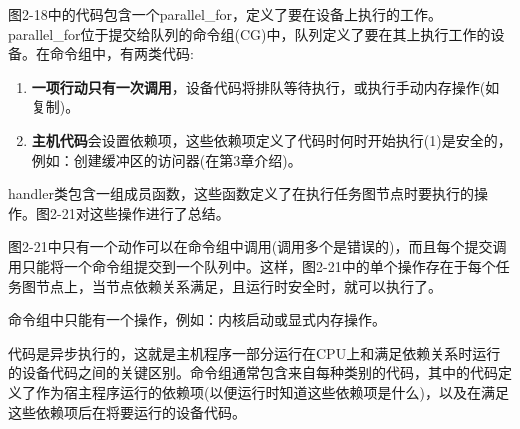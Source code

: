 图2-18中的代码包含一个parallel\_for，定义了要在设备上执行的工作。parallel\_for位于提交给队列的命令组(CG)中，队列定义了要在其上执行工作的设备。在命令组中，有两类代码:\par

\begin{enumerate}
	\item \textbf{一项行动只有一次调用}，设备代码将排队等待执行，或执行手动内存操作(如复制)。
	\item \textbf{主机代码}会设置依赖项，这些依赖项定义了代码时何时开始执行(1)是安全的，例如：创建缓冲区的访问器(在第3章介绍)。
\end{enumerate}

handler类包含一组成员函数，这些函数定义了在执行任务图节点时要执行的操作。图2-21对这些操作进行了总结。\par

图2-21中只有一个动作可以在命令组中调用(调用多个是错误的)，而且每个提交调用只能将一个命令组提交到一个队列中。这样，图2-21中的单个操作存在于每个任务图节点上，当节点依赖关系满足，且运行时安全时，就可以执行了。\par

\begin{tcolorbox}[colback=red!5!white,colframe=red!75!black]
	命令组中只能有一个操作，例如：内核启动或显式内存操作。
\end{tcolorbox}

代码是异步执行的，这就是主机程序一部分运行在CPU上和满足依赖关系时运行的设备代码之间的关键区别。命令组通常包含来自每种类别的代码，其中的代码定义了作为宿主程序运行的依赖项(以便运行时知道这些依赖项是什么)，以及在满足这些依赖项后在将要运行的设备代码。\par

